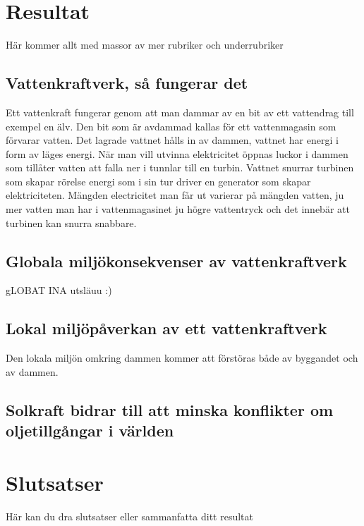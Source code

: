 \documentclass[11p]{article}
\begin{document}
    \section{Resultat}
    Här kommer allt med massor av mer rubriker och underrubriker

    \subsection{Vattenkraftverk, så fungerar det}
    Ett vattenkraft fungerar genom att man dammar av en bit av ett vattendrag till exempel en älv.
    Den bit som är avdammad kallas för ett vattenmagasin som förvarar vatten.
    Det lagrade vattnet hålls in av dammen, vattnet har energi i form av läges energi.
    När man vill utvinna elektricitet öppnas luckor i dammen som tillåter vatten att falla ner i tunnlar till en turbin.
    Vattnet snurrar turbinen som skapar rörelse energi som i sin tur driver en generator som skapar elektriciteten.
    Mängden electricitet man får ut varierar på mängden vatten, ju mer vatten man har i vattenmagasinet ju högre vattentryck och det innebär att turbinen kan snurra snabbare.
    \parencite{vattenfall}

    \subsection{Globala miljökonsekvenser av vattenkraftverk}
    gLOBAT INA utsläuu :)

    \subsection{Lokal miljöpåverkan av ett vattenkraftverk}
    Den lokala miljön omkring dammen kommer att förstöras både av byggandet och av dammen.
    \parencite{Vattenkraft: för och mot}


    \subsection{Solkraft bidrar till att minska konflikter om oljetillgångar i världen}


    \subsection{}

    \section{Slutsatser}
    Här kan du dra slutsatser eller sammanfatta ditt resultat
\end{document}
